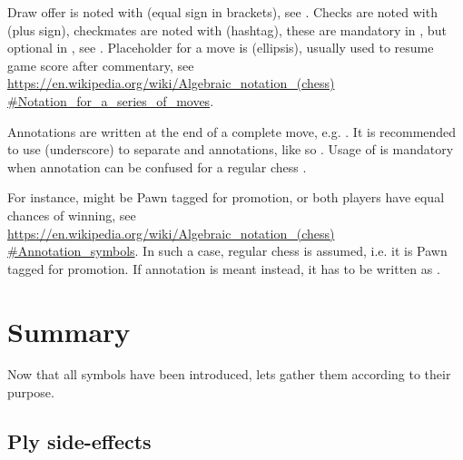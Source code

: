 Draw offer is noted with \alg{(=)} (equal sign in brackets), see . Checks are noted with \alg{+} (plus sign),
checkmates are noted with \alg{\#} (hashtag), these are mandatory in , but optional in , see
. Placeholder for a move is  (ellipsis), usually used to resume game score after commentary, see\\
\href{https://en.wikipedia.org/wiki/Algebraic\_notation\_(chess)\#Notation\_for\_a\_series\_of\_moves}{https://en.wikipedia.org/wiki/Algebraic\_notation\_(chess)\\
\#Notation\_for\_a\_series\_of\_moves}.

Annotations are written at the end of a complete move, e.g. . It is recommended to use \alg{\_} (underscore)
to separate  and annotations, like so . Usage of \alg{\_} is mandatory when annotation can be
confused for a regular chess .

For instance,  might be Pawn tagged for promotion, or both players have equal chances of winning, see\\
\href{https://en.wikipedia.org/wiki/Algebraic\_notation\_(chess)#Annotation\_symbols}{https://en.wikipedia.org/wiki/Algebraic\_notation\_(chess)\\
\#Annotation\_symbols}. In such a case, regular chess  is assumed, i.e. it is Pawn tagged for promotion.
If annotation is meant instead, it has to be written as .

\clearpage %

\section*{Summary}
\label{sec:Appendix/Summary}

Now that all symbols have been introduced, lets gather them according to their purpose.

\subsection*{Ply side-effects}
\label{sec:Appendix/Summary/Ply side-effects}

